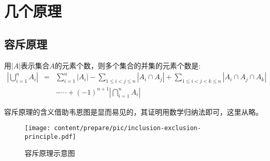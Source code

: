 
\section{几个原理}
\label{sec:some-principle}

\subsection{容斥原理}
\label{subsec:inclusion-exclusion-principle}

\begin{principle}[容斥原理]
  用$|A|$表示集合$A$的元素个数，则多个集合的并集的元素个数是:
  \begin{eqnarray}
    \label{eq:inclusion-exclusion-principle}
    \left| \bigcup_{i=1}^nA_i \right| & = & \sum_{i=1}^n|A_i|-\sum_{1\leqslant i <j \leqslant n} \left| A_i \cap A_j \right| +\sum_{1 \leqslant i <j <k \leqslant n} \left| A_i\cap A_j \cap A_k \right| \nonumber \\
 & & -\cdots+(-1)^{n+1} \left| \bigcap_{i=1}^n A_i \right|
  \end{eqnarray}
\end{principle}
容斥原理的含义借助韦恩图是显而易见的，其证明用数学归纳法即可，这里从略。

\begin{figure}[htbp]
  \centering
\texttt{[image: content/prepare/pic/inclusion-exclusion-principle.pdf]}
\caption{容斥原理示意图}
\label{fig:inclusion-exclusion-principle}
\end{figure}


